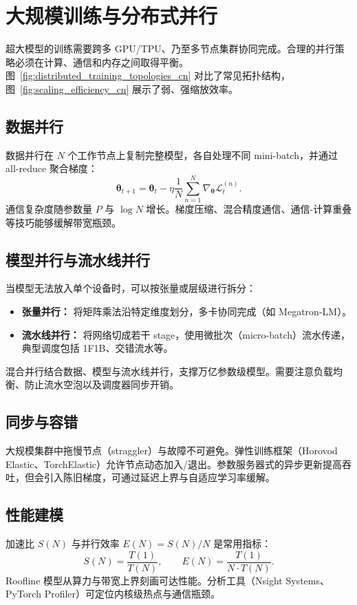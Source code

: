 \documentclass[UTF8,zihao=-4]{ctexart}
\begin{document}
\section{大规模训练与分布式并行}
超大模型的训练需要跨多 GPU/TPU、乃至多节点集群协同完成。合理的并行策略必须在计算、通信和内存之间取得平衡。图~\ref{fig:distributed_training_topologies_cn} 对比了常见拓扑结构，图~\ref{fig:scaling_efficiency_cn} 展示了弱、强缩放效率。

\subsection{数据并行}
数据并行在 $N$ 个工作节点上复制完整模型，各自处理不同 mini-batch，并通过 all-reduce 聚合梯度：
\begin{equation}
  \boldsymbol{\theta}_{t+1} = \boldsymbol{\theta}_t - \eta \frac{1}{N} \sum_{n=1}^{N} \nabla_{\boldsymbol{\theta}} \mathcal{L}_t^{(n)}.
\end{equation}
通信复杂度随参数量 $P$ 与 $\log N$ 增长。梯度压缩、混合精度通信、通信-计算重叠等技巧能够缓解带宽瓶颈。

\subsection{模型并行与流水线并行}
当模型无法放入单个设备时，可以按张量或层级进行拆分：
\begin{itemize}
  \item \textbf{张量并行：} 将矩阵乘法沿特定维度划分，多卡协同完成（如 Megatron-LM）。
  \item \textbf{流水线并行：} 将网络切成若干 stage，使用微批次（micro-batch）流水传递，典型调度包括 1F1B、交错流水等。
\end{itemize}
混合并行结合数据、模型与流水线并行，支撑万亿参数级模型。需要注意负载均衡、防止流水空泡以及调度器同步开销。

\subsection{同步与容错}
大规模集群中拖慢节点（straggler）与故障不可避免。弹性训练框架（Horovod Elastic、TorchElastic）允许节点动态加入/退出。参数服务器式的异步更新提高吞吐，但会引入陈旧梯度，可通过延迟上界与自适应学习率缓解。

\subsection{性能建模}
加速比 $S(N)$ 与并行效率 $E(N) = S(N) / N$ 是常用指标：
\begin{equation}
  S(N) = \frac{T(1)}{T(N)}, \qquad E(N) = \frac{T(1)}{N \cdot T(N)}.
\end{equation}
Roofline 模型从算力与带宽上界刻画可达性能。分析工具（Nsight Systems、PyTorch Profiler）可定位内核级热点与通信瓶颈。
\end{document}
